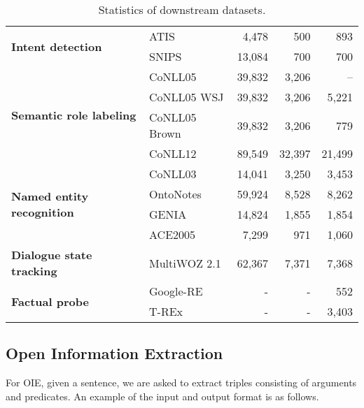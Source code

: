 \begin{table}[t]
{\begin{tabular} {l | l | r r r}
    \hline
    \multirow{2}{*}{{\small \bf Intent detection}}
                                    & ATIS                              &  4,478  &    500 &     893 \\
                                    & SNIPS                             & 13,084  &    700 &     700 \\
    \hline
    \multirow{4}{*}{{\small \bf Semantic role labeling}}
                                    & CoNLL05                           &  39,832 &  3,206 &    --  \\
                                    & CoNLL05 WSJ                       &  39,832 &  3,206 &  5,221 \\
                                    & CoNLL05 Brown                     &  39,832 &  3,206 &    779 \\
                                    & CoNLL12                           &  89,549 & 32,397 & 21,499 \\
    \hline
    \multirow{4}{*}{{\small \bf Named entity recognition}}
                                    & CoNLL03                           &  14,041 &  3,250 &  3,453 \\
                                    & OntoNotes                         &  59,924 &  8,528 &  8,262 \\
                                    & GENIA                             &  14,824 &  1,855 &  1,854 \\
                                    & ACE2005                           &   7,299 &    971 &  1,060 \\
    \hline
    {\small \bf Dialogue state tracking}                                & MultiWOZ 2.1                      & 62,367  &  7,371 &   7,368 \\
    \hline
    \multirow{2}{*}{{\small \bf Factual probe}}
                                    & Google-RE                         &      -  &      - &     552 \\
                                    & T-REx                             &      -  &      - &   3,403 \\
    \bottomrule
  \end{tabular}
  }
\caption{{\small Statistics of downstream datasets.}}
\label{tab:statistics}
\end{table}


 
\subsection{Open Information Extraction}
\label{sec:appendixoie}
For OIE, given a sentence, we are asked to extract triples consisting of arguments and predicates. An example of the input and output format is as follows.


